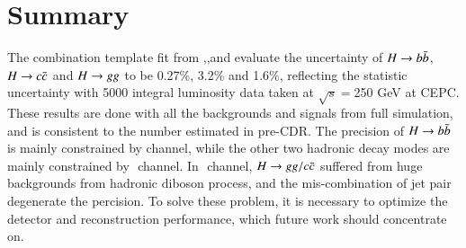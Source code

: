 \section{Summary}\label{sec:summary}
The combination template fit from \eeh,\mmh,\nnh and \qqh $ $evaluate the uncertainty of $H\rightarrow b\bar{b}$, $H\rightarrow c\bar{c}$ and $H\rightarrow gg$ to be 0.27\%, 3.2\% and 1.6\%, reflecting the statistic uncertainty with 5000 \ifb integral luminosity data taken at $\sqrt{s} = $250 GeV at CEPC. These results are done with all the backgrounds and signals from full simulation, and is consistent to the number estimated in pre-CDR. The precision of $H\rightarrow b\bar{b}$ is mainly constrained by \qqh $ $channel, while the other two hadronic decay modes are mainly constrained by \nnh$ $ channel. In \qqh$ $ channel, $H\rightarrow gg/c\bar{c}$ suffered from huge backgrounds from hadronic diboson process, and the mis-combination of jet pair degenerate the percision. To solve these problem, it is necessary to optimize the detector and reconstruction performance, which future work should concentrate on.